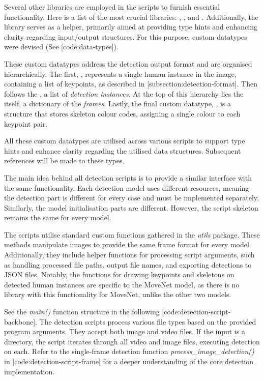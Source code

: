 Several other libraries are employed in the scripts to furnish essential functionality. Here is a list of the most crucial libraries: , ,  and . Additionally, the  library serves as a helper, primarily aimed at providing type hints and enhancing clarity regarding input/output structures. For this purpose, custom datatypes were devised (See [code:data-types]).


These custom datatypes address the detection output format and are organised hierarchically. The first, , represents a single human instance in the image, containing a list of keypoints, as described in [subsection:detection-format]. Then follows the , a list of {\em detection instances}. At the top of this hierarchy lies the  itself, a dictionary of the {\em frames}. Lastly, the final custom datatype, , is a structure that stores skeleton colour codes, assigning a single colour to each keypoint pair.

All these custom datatypes are utilised across various scripts to support type hints and enhance clarity regarding the utilised data structures. Subsequent references will be made to these types.

The main idea behind all detection scripts is to provide a similar interface with the same functionality. Each detection model uses different resources, meaning the detection part is different for every case and must be implemented separately. Similarly, the model initialisation parts are different. However, the script skeleton remains the same for every model.

The scripts utilise standard custom functions gathered in the {\it utils} package. These methods manipulate images to provide the same frame format for every model. Additionally, they include helper functions for processing script arguments, such as handling processed file paths, output file names, and exporting detections to JSON files. Notably, the functions for drawing keypoints and skeletons on detected human instances are specific to the MoveNet model, as there is no library with this functionality for MoveNet, unlike the other two models.

See the {\it main()} function structure in the following [code:detection-script-backbone]. The detection scripts process various file types based on the provided program arguments. They accept both image and video files. If the input is a directory, the script iterates through all video and image files, executing detection on each. Refer to the single-frame detection function {\it process_image_detection()} in [code:detection-script-frame] for a deeper understanding of the core detection implementation.

